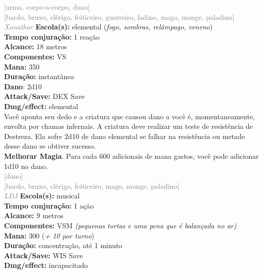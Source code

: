 \documentclass{RPG_Adventure}[2021/10/20]
\begin{document}
{\scriptsize \textcolor{gray}{[arma, corpo-a-corpo, dano]\\}}
{\scriptsize \textcolor{gray}{[bardo, bruxo, clérigo, feiticeiro, guerreiro, ladino, mago, monge, paladino]\\}}
{\tiny \textcolor{gray}{\textit{Xanathar}}}
{\small \t \textbf{Escola(s):} elemental (\textit{fogo, sombras, relâmpago, veneno})\\\t \textbf{Tempo conjuração:} 1 reação\\\t \textbf{Alcance:} 18 metros\\\t \textbf{Componentes:} VS\\\t \textbf{Mana:} 350\\\t \textbf{Duração:} instantânea\\\t \textbf{Dano}: 2d10\\\t \textbf{Attack/Save:} DEX Save\\\t \textbf{Dmg/effect:} elemental\\}
{\normalsize Você aponta seu dedo e a criatura que causou dano a você é, momentaneamente, envolta por chamas infernais. A criatura deve realizar um teste de resistência de Destreza. Ela sofre 2d10 de dano elemental se falhar na resistência ou metade desse dano se obtiver sucesso.\\\t \textbf{Melhorar Magia}. Para cada 600 adicionais de mana gastos, você pode adicionar 1d10 no dano.\\}
{\scriptsize \textcolor{gray}{[dano]\\}}
{\scriptsize \textcolor{gray}{[bardo, bruxo, clérigo, feiticeiro, mago, monge, paladino]\\}}
{\tiny \textcolor{gray}{\textit{LDJ}}}
{\small \t \textbf{Escola(s):} musical\\\t \textbf{Tempo conjuração:} 1 ação\\\t \textbf{Alcance:} 9 metros\\\t \textbf{Componentes:} VSM \textit{(pequenas tortas e uma pena que é balançada no ar)}\\\t \textbf{Mana:} 300 (\textit{+ 10 por turno})\\\t \textbf{Duração:} concentração, até 1 minuto\\\t \textbf{Attack/Save:} WIS Save\\\t \textbf{Dmg/effect:} incapacitado\\}
\end{document}
